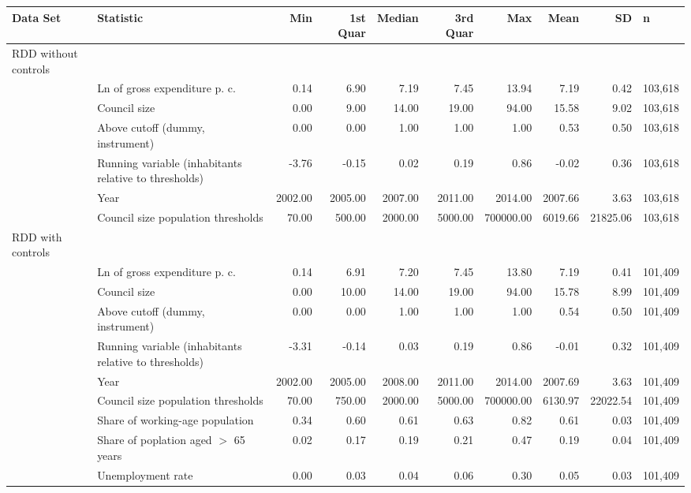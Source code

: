 \begin{tabular}{llrrrrrrrl}
  \toprule
Data Set & Statistic & Min & 1st Quar & Median & 3rd Quar & Max & Mean & SD & n \\ 
  \midrule
RDD without controls &  &  &  &  &  &  &  &  &  \\ 
   & Ln of gross expenditure p. c. & 0.14 & 6.90 & 7.19 & 7.45 & 13.94 & 7.19 & 0.42 & 103,618 \\ 
   & Council size & 0.00 & 9.00 & 14.00 & 19.00 & 94.00 & 15.58 & 9.02 & 103,618 \\ 
   & Above cutoff (dummy, instrument) & 0.00 & 0.00 & 1.00 & 1.00 & 1.00 & 0.53 & 0.50 & 103,618 \\ 
   & Running variable (inhabitants relative to thresholds) & -3.76 & -0.15 & 0.02 & 0.19 & 0.86 & -0.02 & 0.36 & 103,618 \\ 
   & Year & 2002.00 & 2005.00 & 2007.00 & 2011.00 & 2014.00 & 2007.66 & 3.63 & 103,618 \\ 
   & Council size population thresholds & 70.00 & 500.00 & 2000.00 & 5000.00 & 700000.00 & 6019.66 & 21825.06 & 103,618 \\ 
  RDD with controls &  &  &  &  &  &  &  &  &  \\ 
   & Ln of gross expenditure p. c. & 0.14 & 6.91 & 7.20 & 7.45 & 13.80 & 7.19 & 0.41 & 101,409 \\ 
   & Council size & 0.00 & 10.00 & 14.00 & 19.00 & 94.00 & 15.78 & 8.99 & 101,409 \\ 
   & Above cutoff (dummy, instrument) & 0.00 & 0.00 & 1.00 & 1.00 & 1.00 & 0.54 & 0.50 & 101,409 \\ 
   & Running variable (inhabitants relative to thresholds) & -3.31 & -0.14 & 0.03 & 0.19 & 0.86 & -0.01 & 0.32 & 101,409 \\ 
   & Year & 2002.00 & 2005.00 & 2008.00 & 2011.00 & 2014.00 & 2007.69 & 3.63 & 101,409 \\ 
   & Council size population thresholds & 70.00 & 750.00 & 2000.00 & 5000.00 & 700000.00 & 6130.97 & 22022.54 & 101,409 \\ 
   & Share of working-age population & 0.34 & 0.60 & 0.61 & 0.63 & 0.82 & 0.61 & 0.03 & 101,409 \\ 
   & Share of poplation aged $>$ 65 years & 0.02 & 0.17 & 0.19 & 0.21 & 0.47 & 0.19 & 0.04 & 101,409 \\ 
   & Unemployment rate & 0.00 & 0.03 & 0.04 & 0.06 & 0.30 & 0.05 & 0.03 & 101,409 \\ 

\end{tabular}
